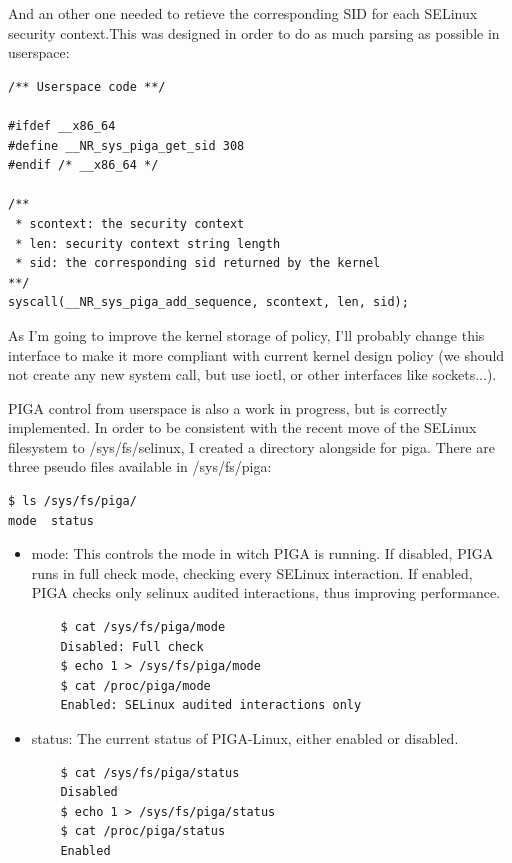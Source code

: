 \documentclass[pdftex,a4paper,titlepage,11pt]{article}
\begin{document}
And an other one needed to retieve the corresponding SID for each SELinux
security context.This was designed in order to do as much parsing as possible in
userspace:

\begin{lstlisting}
/** Userspace code **/

#ifdef __x86_64
#define __NR_sys_piga_get_sid 308
#endif /* __x86_64 */

/**
 * scontext: the security context
 * len: security context string length
 * sid: the corresponding sid returned by the kernel
**/
syscall(__NR_sys_piga_add_sequence, scontext, len, sid);
\end{lstlisting}

As I'm going to improve the kernel storage of policy, I'll probably change this
interface to make it more compliant with current kernel design policy (we should
not create any new system call, but use ioctl, or other interfaces like
sockets...).

PIGA control from userspace is also a work in progress, but is correctly
implemented. In order to be consistent with the recent move of the SELinux
filesystem to /sys/fs/selinux, I created a directory alongside for piga. There
are three pseudo files available in /sys/fs/piga: %

\begin{lstlisting}
$ ls /sys/fs/piga/
mode  status
\end{lstlisting}

\begin{itemize}
	\item mode: This controls the mode in witch PIGA is running. If disabled,
PIGA runs in full check mode, checking every SELinux interaction. If enabled,
PIGA checks only selinux audited interactions, thus improving performance.
	\begin{lstlisting}
	$ cat /sys/fs/piga/mode
	Disabled: Full check
	$ echo 1 > /sys/fs/piga/mode
	$ cat /proc/piga/mode
	Enabled: SELinux audited interactions only
	\end{lstlisting}
	\item status: The current status of PIGA-Linux, either enabled or disabled.
	\begin{lstlisting}
	$ cat /sys/fs/piga/status
	Disabled
	$ echo 1 > /sys/fs/piga/status
	$ cat /proc/piga/status
	Enabled
	\end{lstlisting}
\end{itemize}

\newpage
\end{document}
